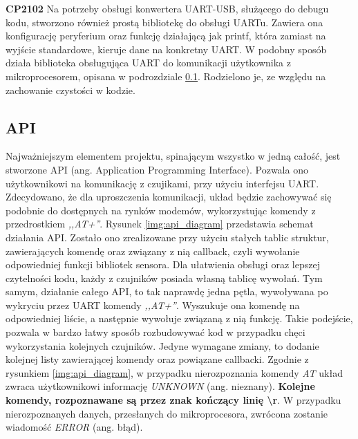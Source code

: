 \newline
\newline
\textbf{CP2102}
\newline
Na potrzeby obsługi konwertera UART-USB, służącego do debugu kodu, stworzono również prostą bibliotekę do obsługi UARTu. Zawiera ona konfigurację peryferium oraz funkcję działającą jak printf, która zamiast na wyjście standardowe, kieruje dane na konkretny UART. W podobny sposób działa biblioteka obsługująca UART do komunikacji użytkownika z mikroprocesorem, opisana w podrozdziale \ref{sub:api}. Rodzielono je, ze względu na zachowanie czystości w kodzie.
\subsection{API}
\label{sub:api}
Najważniejszym elementem projektu, spinającym wszystko w jedną całość, jest stworzone API (ang. Application Programming Interface). Pozwala ono użytkownikowi na komunikację z czujikami, przy użyciu interfejsu UART. Zdecydowano, że dla uproszczenia komunikacji, układ będzie zachowywać się podobnie do dostępnych na rynków modemów, wykorzystując komendy z przedrostkiem \textit{,,AT+''}. Rysunek \ref{img:api_diagram} przedstawia schemat działania API. Zostało ono zrealizowane przy użyciu stałych tablic struktur, zawierających komendę oraz związany z nią callback, czyli wywołanie odpowiedniej funkcji bibliotek sensora. Dla ułatwienia obsługi oraz lepszej czytelności kodu, każdy z czujników posiada własną tablicę wywołań. Tym samym, działanie całego API, to tak naprawdę jedna pętla, wywoływana po wykryciu przez UART komendy \textit{,,AT+''}. Wyszukuje ona komendę na odpowiedniej liście, a następnie wywołuje związaną z nią funkcję. Takie podejście, pozwala w bardzo łatwy sposób rozbudowywać kod w przypadku chęci wykorzystania kolejnych czujników. Jedyne wymagane zmiany, to dodanie kolejnej listy zawierającej komendy oraz powiązane callbacki. Zgodnie z rysunkiem \ref{img:api_diagram}, w przypadku nierozpoznania komendy \textit{AT} układ zwraca użytkownikowi informację \textit{UNKNOWN} (ang. nieznany). \textbf{Kolejne komendy, rozpoznawane są przez znak kończący linię \textbackslash r}. W przypadku nierozpoznanych danych, przesłanych do mikroprocesora, zwrócona zostanie wiadomość \textit{ERROR} (ang. błąd).

